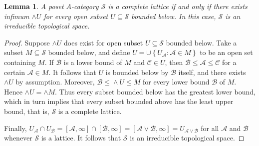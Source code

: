 \documentclass[12pt]{amsart}%
\theoremstyle{plain}
\newtheorem{lemma}{Lemma}
\numberwithin{equation}{section}
\numberwithin{equation}{section}
\numberwithin{theorem}{section}
\numberwithin{lemma}{section}
\numberwithin{remark}{section}
\numberwithin{example}{section}
\numberwithin{proposition}{section}
\numberwithin{definition}{section}
\numberwithin{corollary}{section}
\begin{document}
\begin{lemma}
\label{lemCes1}A poset $A$-category $\mathcal{S}$ is a complete lattice if and
only if there exists infimum $\wedge U$ for every open subset $U\subseteq
\mathcal{S}$ bounded below. In this case, $\mathcal{S}$ is an irreducible
topological space.
\end{lemma}

\begin{proof}
Suppose $\wedge U$ does exist for open subset $U\subseteq\mathcal{S}$ bounded
below. Take a subset $M\subseteq\mathcal{S}$ bounded below, and define
$U=\cup\left\{  U_{\mathcal{A}}:\mathcal{A\in}M\right\}  $ to be an open set
containing $M$. If $\mathcal{B}$ is a lower bound of $M$ and $\mathcal{C\in}%
U$, then $\mathcal{B\leq A\leq C}$ for a certain $\mathcal{A\in}M$. It follows
that $U$ is bounded below by $\mathcal{B}$ itself, and there exists $\wedge U$
by assumption. Moreover, $\mathcal{B\leq}\wedge U\leq M$ for every lower bound
$\mathcal{B}$ of $M$. Hence $\wedge U=\wedge M$. Thus every subset bounded
below has the greatest lower bound, which in turn implies that every subset
bounded above has the least upper bound, that is, $\mathcal{S}$ is a complete lattice.

Finally, $U_{\mathcal{A}}\cap U_{\mathcal{B}}=\left[  \mathcal{A}%
,\infty\right]  \cap\left[  \mathcal{B},\infty\right]  =\left[  \mathcal{A}%
\vee\mathcal{B},\infty\right]  =U_{\mathcal{A}\vee\mathcal{B}}$ for all
$\mathcal{A}$ and $\mathcal{B}$ whenever $\mathcal{S}$ is a lattice. It
follows that $\mathcal{S}$ is an irreducible topological space.
\end{proof}
\end{document}
